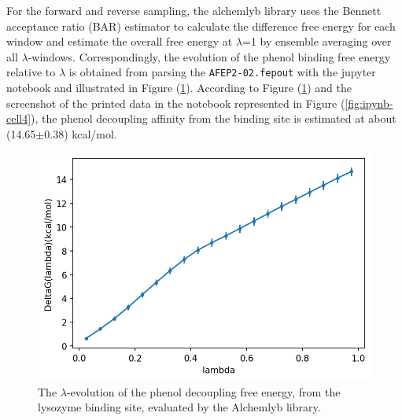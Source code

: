 \documentclass[9pt,tutorial]{livecoms}
\begin{document}
For the forward and reverse sampling, the alchemlyb library uses the Bennett acceptance ratio (BAR) estimator to calculate the difference free energy for each window and estimate the overall free energy at {$\lambda$}=1 by ensemble averaging over all {$\lambda$}-windows. Correspondingly, the evolution of the phenol binding free energy relative to {$\lambda$} is obtained from parsing the \texttt{AFEP2-02.fepout} with the jupyter notebook and illustrated in Figure (\ref{fig:AFEP-decoupling1}). According to Figure (\ref{fig:AFEP-decoupling1}) and the screenshot of the printed data in the notebook represented in Figure (\ref{fig:ipynb-cell4}), the phenol decoupling affinity from the binding site is estimated at about (14.65$\pm$0.38) kcal/mol.

\begin{figure}[th!]
\centering
\includegraphics[width=0.8\linewidth]{Supp-Files/AFEP-Bound-Decoupling/output/Alchemlyb/output_4_1.png}
\caption{The {$\lambda$}-evolution of the phenol decoupling free energy, from the lysozyme binding site, evaluated by the Alchemlyb library.}\label{fig:AFEP-decoupling1}
\end{figure}
\end{document}
